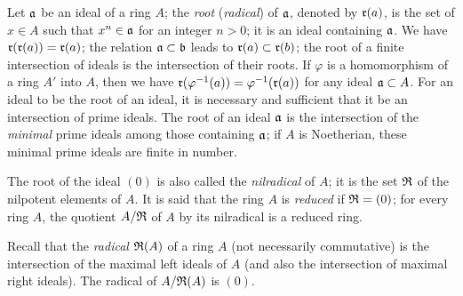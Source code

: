 \documentclass[../main.tex]{subfiles}
\begin{document}
\begin{cx}[1.1.1]
Let $\mathfrak{a}$ be an ideal of a ring $A$; the \emph{root} (\emph{radical}) of $\mathfrak{a}$, denoted
by $\mathfrak{r}(a)$, is the set of $x\in A$ such that $x^n\in\mathfrak{a}$ for an integer $n>0$; it is an
ideal containing $\mathfrak{a}$. We have $\mathfrak{r}(\mathfrak{r}(a))=\mathfrak{r}(a)$; the relation $\mathfrak{a}\subset\mathfrak{b}$
leads to $\mathfrak{r}(a)\subset\mathfrak{r}(b)$; the root of a finite intersection of ideals is the
intersection of their roots. If $\varphi$  is a homomorphism of a ring $A'$ into $A$, then we
have $\mathfrak{r}(\varphi^{-1}(a))=\varphi^{-1}(\mathfrak{r}(a))$
for any ideal $\mathfrak{a}\subset A$. For an ideal to be the root of an ideal,
it is necessary and sufficient that it be an intersection of prime ideals. The root of an
ideal $\mathfrak{a}$ is the intersection of the
\emph{minimal} prime ideals among those containing $\mathfrak{a}$; if $A$ is
Noetherian, these minimal prime ideals are finite in number.

The root of the ideal $(0)$ is also called the \emph{nilradical} of $A$; it is the set
$\mathfrak{R}$ of the nilpotent elements of $A$. It is said that the ring $A$ is \emph{reduced} if
$\mathfrak{R}=(0)$; for every ring $A$, the quotient $A/\mathfrak{R}$ of $A$ by its nilradical is a
reduced ring.
\end{cx}

\begin{cx}[1.1.2]
Recall that the \emph{radical} $\mathfrak{R}(A)$ of a ring $A$ (not necessarily commutative) is the
intersection of the maximal left ideals of $A$ (and also the intersection of maximal
right ideals). The radical of $A/\mathfrak{R}(A)$ is $(0)$.
\end{cx}
\end{document}
